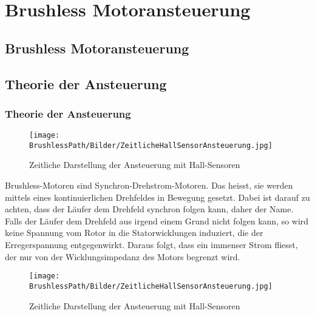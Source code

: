 \ifSTANDALONE
\section{Brushless Motoransteuerung}
\fi
\ifEMBED
\subsection{Brushless Motoransteuerung}
\fi

\ifEMBED
    \BLDCcollab
\fi
    \ifSTANDALONE
    \subsection{Theorie der Ansteuerung}
    \fi
    \ifEMBED
    \subsubsection{Theorie der Ansteuerung}
    \fi
    \ifEMBED
        \begin{wrapfigure}{r}{0.50\textwidth}
           	\texttt{[image: \\BrushlessPath/Bilder/ZeitlicheHallSensorAnsteuerung.jpg]}
           	\caption[Zeitliche Darstellung der Ansteuerung mit 
                Hall-Sensoren]{Zeitliche Darstellung der Ansteuerung mit 
                Hall-Sensoren \cite{AppNote:BrushlessuC}}
           	\centering
            \label{abb:ZeitlicheAnsteuerungBrushlessMotor}
        \end{wrapfigure}
    \fi
        Brushless-Motoren sind Synchron-Drehstrom-Motoren. Das heisst, sie 
        werden mittels eines kontinuierlichen Drehfeldes in Bewegung gesetzt. 
        Dabei ist darauf zu achten, dass der Läufer dem Drehfeld synchron 
        folgen kann, daher der Name. Falls der Läufer dem Drehfeld aus irgend 
        einem Grund nicht folgen kann, so wird keine Spannung vom Rotor in die 
        Statorwicklungen induziert, die der Erregerspannung entgegenwirkt. 
        Daraus folgt, dass ein immenser Strom fliesst, der nur von der 
        Wicklungsimpedanz des Motors begrenzt wird.\\
        \ifSTANDALONE
           \begin{figure}[h!]
               \centering
               \texttt{[image: \\BrushlessPath/Bilder/ZeitlicheHallSensorAnsteuerung.jpg]}
               \caption[Zeitliche Darstellung der Ansteuerung mit 
                   Hall-Sensoren]{Zeitliche Darstellung der Ansteuerung mit 
                   Hall-Sensoren \cite{AppNote:BrushlessuC}}
              	\centering
               \label{abb:ZeitlicheAnsteuerungBrushlessMotor}
           \end{figure}
